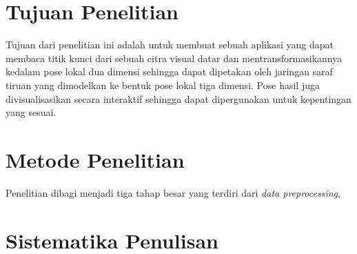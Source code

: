 \section{Tujuan Penelitian}
\label{sec:1-TujuanPenelitian}

Tujuan dari penelitian ini adalah untuk membuat sebuah aplikasi yang dapat membaca titik kunci dari 
sebuah citra visual datar dan mentransformasikannya kedalam pose lokal dua dimensi sehingga dapat 
dipetakan oleh jaringan saraf tiruan yang dimodelkan ke bentuk pose lokal tiga dimensi. Pose hasil
juga divisualisasikan secara interaktif sehingga dapat dipergunakan untuk kepentingan yang sesuai.

\section{Metode Penelitian}
\label{sec:1-MetodePenelitian}

Penelitian dibagi menjadi tiga tahap besar yang terdiri dari \textit{data preprocessing}, 

\section{Sistematika Penulisan}
\label{sec:1-SistematikaPenulisan}

